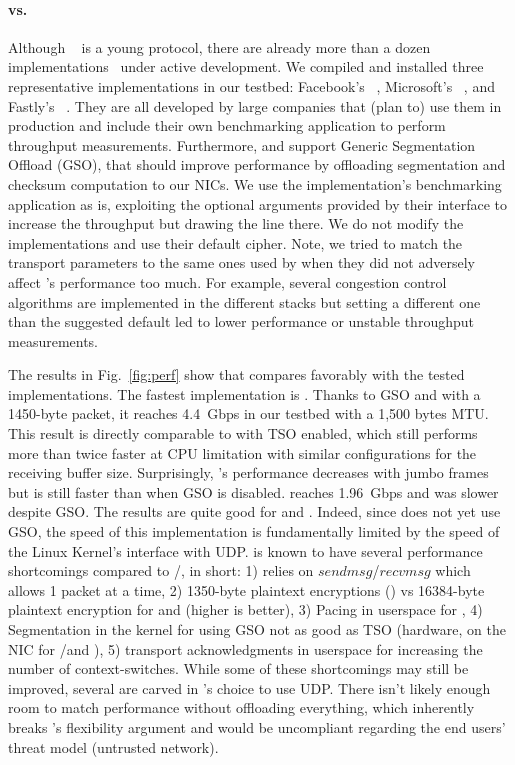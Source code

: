 \paragraph{\tcpls vs. \quic}
Although \quic~\cite{draft-ietf-quic-transport} is a young protocol, there are
already more than a dozen
implementations~\cite{marx2020same,quicimplem,yang2020making} under active
development. We compiled and installed three representative \quic
implementations in our testbed: Facebook's
\mvfst~\cite{mvfst-github,Joras_mvfst}, Microsoft's
\msquic~\cite{msquic-github}, and Fastly's \quicly~\cite{quicly-github}. They
are all developed by large companies that (plan to) use them in production and
include their own benchmarking application to perform throughput measurements.
Furthermore, \mvfst and \quicly support Generic Segmentation Offload (GSO), that
should improve performance by offloading \udp segmentation and checksum
computation to our NICs. We use the implementation's benchmarking application as
is, exploiting the optional arguments provided by their interface to increase
the throughput but drawing the line there. We do not modify the \quic
implementations and use their default cipher. Note, we tried to match the
transport parameters to the same ones used by \tcpls when they did not adversely
affect \quic's performance too much. For example, several congestion control
algorithms are implemented in the different \quic stacks but setting a different
one than the suggested default led to lower performance or unstable throughput
measurements.

The results in Fig.~\ref{fig:perf} show that \tcpls compares favorably
with the tested \quic implementations. The fastest \quic implementation is
\quicly. Thanks to GSO and with a 1450-byte \quic packet, it reaches 4.4~Gbps in our testbed with a 1,500 bytes
MTU. This result is directly comparable to \tcpls with TSO enabled, which still
performs more than twice faster at CPU limitation with similar configurations
for the receiving buffer size. Surprisingly, \quicly's performance decreases with
jumbo frames but is still faster than when GSO is disabled.  \msquic reaches
1.96~Gbps and \mvfst was slower despite GSO. The results are quite good for
\msquic and \quicly. Indeed, since \msquic does not yet use GSO, the speed of
this implementation is fundamentally limited by the speed of the Linux Kernel's
interface with UDP. \quic is known to have several performance shortcomings compared
to \tls/\tcp, in short: 1) \quic relies on $sendmsg$/$recvmsg$ which allows 1
packet at a time, 2) 1350-byte
plaintext encryptions (\quic) vs 16384-byte plaintext encryption for \tls and
\tcpls (higher is better),
3) Pacing in userspace for \quic, 4) Segmentation in the kernel for \quic using GSO not as good as TSO
(hardware, on the NIC for \tls/\tcp and \tcpls), 5) transport
acknowledgments in userspace for \quic increasing the number of context-switches. While some of these shortcomings may
still be improved, several are carved in \quic's choice to use UDP. There isn't likely enough room to match \tcpls performance
without offloading everything, which inherently breaks \quic's flexibility
argument and would be uncompliant regarding the end users' threat model (untrusted
network).



